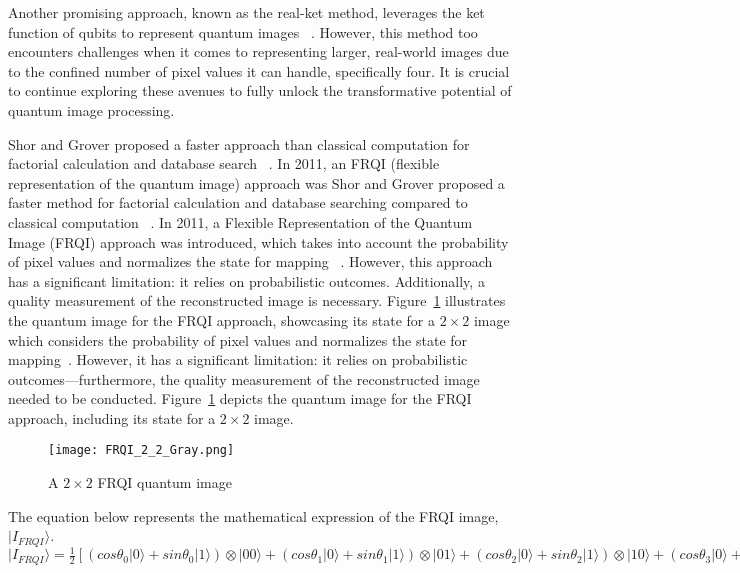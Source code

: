 Another promising approach, known as the real-ket method, leverages the ket function of qubits to represent quantum images ~\cite{b12}. However, this method too encounters challenges when it comes to representing larger, real-world images due to the confined number of pixel values it can handle, specifically four. It is crucial to continue exploring these avenues to fully unlock the transformative potential of quantum image processing.

Shor and Grover proposed a faster approach than classical computation for factorial calculation and database search ~\cite{b5, b6}. In 2011, an FRQI (flexible representation of the quantum image) approach was Shor and Grover proposed a faster method for factorial calculation and database searching compared to classical computation ~\cite{b5, b6}. In 2011, a Flexible Representation of the Quantum Image (FRQI) approach was introduced, which takes into account the probability of pixel values and normalizes the state for mapping ~\cite{b13}. However, this approach has a significant limitation: it relies on probabilistic outcomes. Additionally, a quality measurement of the reconstructed image is necessary. Figure~\ref{FRQI_A} illustrates the quantum image for the FRQI approach, showcasing its state for a \(2\times2\) image which considers the probability of pixel values and normalizes the state for mapping~\cite{b13}. However, it has a significant limitation: it relies on probabilistic outcomes—furthermore, the quality measurement of the reconstructed image needed to be conducted. Figure~\ref{FRQI_A} depicts the quantum image for the FRQI approach, including its state for a $2\times2$ image. 

\begin{figure}[htbp]
\centerline{\texttt{[image: FRQI\_2\_2\_Gray.png]}}
\caption{A $2\times2$ FRQI quantum image}
\label{FRQI_A}
\end{figure}

The equation below represents the mathematical expression of the FRQI image, $|I_{FRQI}\rangle$.\\ 


\begin{math}
|I_{FRQI}\rangle=\frac{1}{2} [\left(cos\theta_{0}|0\rangle +sin\theta_{0}|1\rangle \right) \otimes |00\rangle 
+\left(cos\theta_{1}|0\rangle+sin\theta_{1}|1\rangle \right)\otimes|01\rangle +  \left(cos\theta_{2}|0\rangle+sin\theta_{2}|1\rangle \right)\otimes|10\rangle+ \left(cos\theta_{3}|0\rangle+sin\theta_{3}|1\rangle \right)\otimes|11\rangle ]\nonumber
\end{math}

